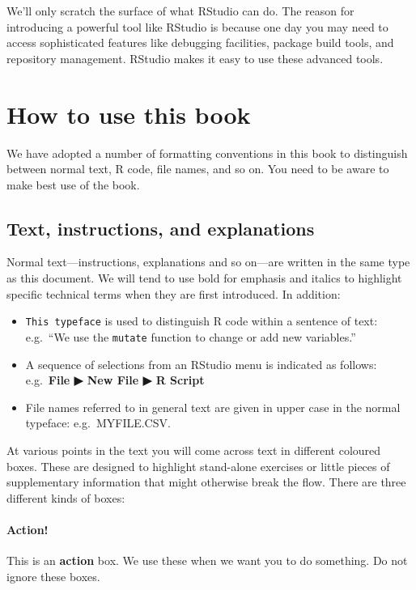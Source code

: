 \documentclass[
]{book}
\providecommand{\tightlist}{%
  \setlength{\itemsep}{0pt}\setlength{\parskip}{0pt}}
\newenvironment{greybox}{
  \definecolor{shadecolor}{rgb}{0.95,0.95,0.95}  %
  \color{black}
  \begin{shaded}}
 {\end{shaded}}
\newenvironment{infobox}[1]
  {
  \begin{itemize}
  \renewcommand{\labelitemi}{
    \raisebox{-.7\height}[0pt][0pt]{
      {\setkeys{Gin}{width=3em,keepaspectratio}
        \texttt{[image: images/\#1]}}
    }
  }
  \setlength{\fboxsep}{1em}
  \begin{greybox}
  \item
  }
  {
  \end{greybox}
  \end{itemize}
  }
\begin{document}
We'll only scratch the surface of what RStudio can do. The reason for introducing a powerful tool like RStudio is because one day you may need to access sophisticated features like debugging facilities, package build tools, and repository management. RStudio makes it easy to use these advanced tools.

\hypertarget{how-to-use-this-book}{%
\chapter*{How to use this book}\label{how-to-use-this-book}}

We have adopted a number of formatting conventions in this book to distinguish between normal text, R code, file names, and so on. You need to be aware to make best use of the book.

\hypertarget{text-instructions-and-explanations}{%
\section*{Text, instructions, and explanations}\label{text-instructions-and-explanations}}

Normal text---instructions, explanations and so on---are written in the same type as this document. We will tend to use bold for emphasis and italics to highlight specific technical terms when they are first introduced. In addition:

\begin{itemize}
\tightlist
\item
  \texttt{This\ typeface} is used to distinguish R code within a sentence of text: e.g.~``We use the \texttt{mutate} function to change or add new variables.''
\item
  A sequence of selections from an RStudio menu is indicated as follows: e.g.~\textbf{File ▶ New File ▶ R Script}
\item
  File names referred to in general text are given in upper case in the normal typeface: e.g.~MYFILE.CSV.
\end{itemize}

At various points in the text you will come across text in different coloured boxes. These are designed to highlight stand-alone exercises or little pieces of supplementary information that might otherwise break the flow. There are three different kinds of boxes:

\begin{infobox}{action}

\hypertarget{action}{%
\subsubsection*{Action!}\label{action}}

This is an \textbf{action} box. We use these when we want you to do something. Do not ignore these boxes.

\end{infobox}
\end{document}
